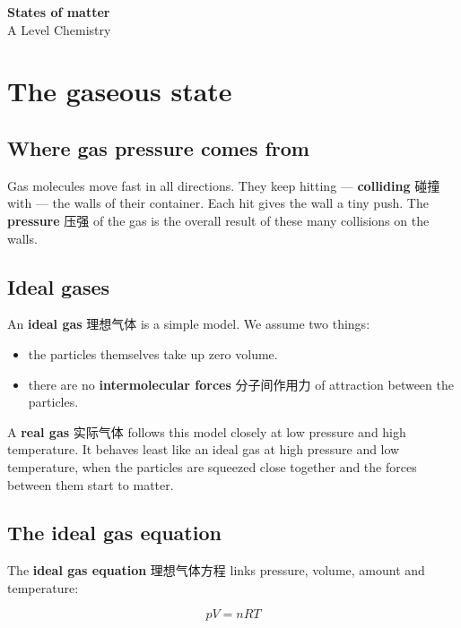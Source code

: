 \documentclass[11pt]{article}
\begin{document}
\begin{center}
  {\LARGE\bfseries States of matter}\\[0.35em]
  {\large A Level Chemistry}
\end{center}
\vspace{0.6em}

\section*{The gaseous state}

\subsection*{Where gas pressure comes from}

Gas molecules move fast in all directions. They keep hitting — \textbf{colliding} 碰撞 with — the walls of their container. Each hit gives the wall a tiny push. The \textbf{pressure} 压强 of the gas is the overall result of these many collisions on the walls.

\subsection*{Ideal gases}

An \textbf{ideal gas} 理想气体 is a simple model. We assume two things:

\begin{itemize}
\item the particles themselves take up zero volume.

\item there are no \textbf{intermolecular forces} 分子间作用力 of attraction between the particles.

\end{itemize}

A \textbf{real gas} 实际气体 follows this model closely at low pressure and high temperature. It behaves least like an ideal gas at high pressure and low temperature, when the particles are squeezed close together and the forces between them start to matter.

\subsection*{The ideal gas equation}

The \textbf{ideal gas equation} 理想气体方程 links pressure, volume, amount and temperature:

\[
pV = nRT
\]
\end{document}
